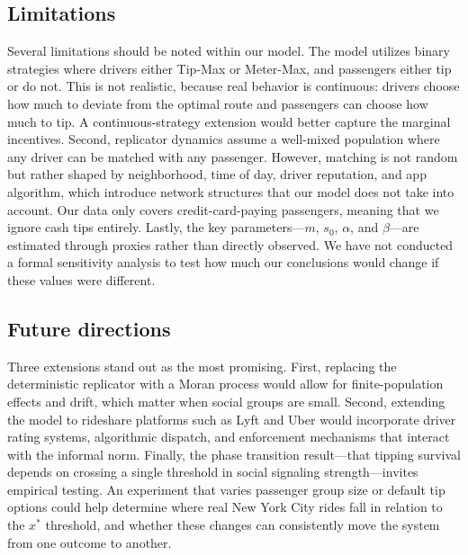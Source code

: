 \documentclass[pdflatex,sn-mathphys-num]{sn-jnl}%
\theoremstyle{thmstyleone}%
\theoremstyle{thmstyletwo}%
\theoremstyle{thmstylethree}%
\begin{document}
\subsection{Limitations}\label{sec:limitations}
Several limitations should be noted within our model. The model utilizes binary strategies where drivers either Tip-Max or Meter-Max, and passengers either tip or do not. This is not realistic, because real behavior is continuous: drivers choose how much to deviate from the optimal route and passengers can choose how much to tip. A continuous-strategy extension would better capture the marginal incentives. Second, replicator dynamics assume a well-mixed population where any driver can be matched with any passenger. However, matching is not random but rather shaped by neighborhood, time of day, driver reputation, and app algorithm, which introduce network structures that our model does not take into account. Our data only covers credit-card-paying passengers, meaning that we ignore cash tips entirely. Lastly, the key parameters---$m$, $s_0$, $\alpha$, and $\beta$---are estimated through proxies rather than directly observed. We have not conducted a formal sensitivity analysis to test how much our conclusions would change if these values were different.

\subsection{Future directions}\label{sec:future}
Three extensions stand out as the most promising. First, replacing the deterministic replicator with a Moran process would allow for finite-population effects and drift, which matter when social groups are small. Second, extending the model to rideshare platforms such as Lyft and Uber would incorporate driver rating systems, algorithmic dispatch, and enforcement mechanisms that interact with the informal norm. Finally, the phase transition result---that tipping survival depends on crossing a single threshold in social signaling strength---invites empirical testing. An experiment that varies passenger group size or default tip options could help determine where real New York City rides fall in relation to the $x^*$ threshold, and whether these changes can consistently move the system from one outcome to another.


\end{document}
